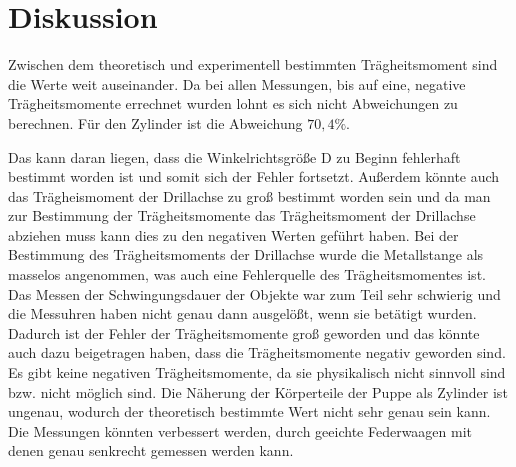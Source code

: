 \section{Diskussion}
Zwischen dem theoretisch und experimentell bestimmten Trägheitsmoment sind die Werte weit auseinander.
Da bei allen Messungen, bis auf eine, negative Trägheitsmomente errechnet wurden lohnt
es sich nicht Abweichungen zu berechnen. Für den Zylinder ist die Abweichung $ 70,4\%$.


Das kann daran liegen, dass die Winkelrichtsgröße D zu Beginn fehlerhaft bestimmt worden ist
und somit sich der Fehler fortsetzt. Außerdem könnte auch das Trägheismoment der Drillachse
zu groß bestimmt worden sein und da man zur Bestimmung der Trägheitsmomente das Trägheitsmoment
der Drillachse abziehen muss kann dies zu den negativen Werten geführt haben.
Bei der Bestimmung des Trägheitsmoments der Drillachse wurde die Metallstange
als masselos angenommen, was auch eine Fehlerquelle des Trägheitsmomentes ist.
Das Messen der Schwingungsdauer der Objekte war zum Teil sehr schwierig und die
Messuhren haben nicht genau dann ausgelößt, wenn sie betätigt wurden. Dadurch ist
der Fehler der Trägheitsmomente groß geworden und das könnte auch dazu beigetragen
haben, dass die Trägheitsmomente negativ geworden sind.
Es gibt keine negativen Trägheitsmomente, da sie physikalisch nicht sinnvoll sind
bzw. nicht möglich sind.
Die Näherung der Körperteile der Puppe als Zylinder ist ungenau, wodurch der
theoretisch bestimmte Wert nicht sehr genau sein kann.
Die Messungen könnten verbessert werden, durch geeichte Federwaagen mit denen
genau senkrecht gemessen werden kann.
